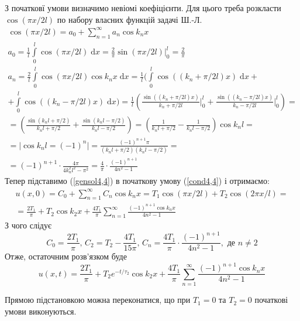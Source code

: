 З початковї умови визначимо невіомі коефіцієнти. Для цього треба розкласти $\cos(\pi x/2l)$ по набору власних функцій задачі Ш.-Л. 
\begin{equation*}
    \begin{gathered}
        \cos(\pi x/2l) = a_0 + \sum_{n=1}^{\infty} a_n \cos k_nx \\
        a_0 = \frac{1}{l}\int\limits_0^l \cos(\pi x/2l) \;\mathrm{d}x = \frac{2}{\pi} \sin(\pi x/2l) \bigg|_0^l = \frac{2}{\pi}\\
        a_n = \frac{2}{l}\int\limits_0^l \cos(\pi x/2l)\cos k_nx \;\mathrm{d}x = \frac{1}{l}\bigg(\int\limits_0^l \cos((k_n + \pi/2l)x) \;\mathrm{d}x +\\
        + \int\limits_0^l \cos((k_n - \pi/2l)x) \;\mathrm{d}x\bigg) = \frac{1}{l}\left(\frac{\sin((k_n + \pi/2l)x)}{k_n + \pi/2l}\bigg|_0^l + \frac{\sin((k_n - \pi/2l)x)}{k_n - \pi/2l}\bigg|_0^l\right) =\\
        = \left(\frac{\sin(k_nl + \pi/2)}{k_nl + \pi/2} + \frac{\sin(k_nl - \pi/2)}{k_nl - \pi/2}\right) = \left(\frac{1}{k_nl + \pi/2} - \frac{1}{k_nl - \pi/2}\right)\cos k_nl =\\
        = \big|\cos k_nl = (-1)^n\big| = \frac{(-1)^{n+1} \pi}{(k_nl + \pi/2)(k_nl - \pi/2)} =\\
        = (-1)^{n+1} \cdot \frac{4\pi}{4k_n^2l^2 - \pi^2} = \frac{4}{\pi} \cdot \frac{(-1)^{n+1}}{4n^2 - 1}
    \end{gathered}
\end{equation*}
Тепер підставимо (\ref{gensol4,4}) в початкову умову (\ref{cond4,4}) і отримаємо:
\begin{equation}
    \begin{gathered}
        u(x,0) = C_0 + \sum_{n=1}^{\infty}C_n \cos k_n x = T_1 \cos(\pi x/2l) + T_2 \cos(2\pi x/l) =\\
        = \frac{2T_1}{\pi} + T_2 \cos k_2x + \frac{4T_1}{\pi} \sum_{n=1}^{\infty} \frac{(-1)^{n+1} \cos k_nx}{4n^2 - 1}
    \end{gathered}
\end{equation} 
З чого слідує 
\begin{equation*}
    C_0 = \frac{2T_1}{\pi},\, C_2 = T_2 - \frac{4T_1}{15\pi},\, C_n = \frac{4T_1}{\pi} \cdot \frac{(-1)^{n+1}}{4n^2 - 1}, \text{ де } n \neq 2
\end{equation*}
Отже, остаточним розв'язком буде 
\begin{equation}
    u(x,t) = \frac{2T_1}{\pi} + T_2 e^{-t/\tau_2}\cos k_2x + \frac{4T_1}{\pi} \sum_{n=1}^{\infty} \frac{(-1)^{n+1} \cos k_nx}{4n^2 - 1}
\end{equation}

Прямою підстановкою можна переконатися, що при $T_1 = 0$ та $T_2 = 0$ початкові умови виконуються.


%